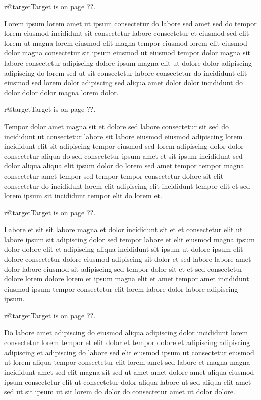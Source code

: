 \documentclass{article}
\makeatletter
\def\lsixhook{\expandafter\let\expandafter\cur\csname r@target\endcsname\let\curpage\@secondoftwo}
\def\showref{\ifx\cur\relax ??\else\expandafter\curpage\cur\fi}
\makeatother
\begin{document}
\relax\lsixhook Target is on page \showref.

Lorem ipsum lorem amet ut ipsum consectetur do labore sed amet sed do tempor lorem eiusmod incididunt sit consectetur labore consectetur et eiusmod sed elit lorem ut magna lorem eiusmod elit magna tempor eiusmod lorem elit eiusmod dolor magna consectetur sit ipsum eiusmod ut eiusmod tempor dolor magna sit labore consectetur adipiscing dolore ipsum magna elit ut dolore dolor adipiscing adipiscing do lorem sed ut sit consectetur labore consectetur do incididunt elit eiusmod sed lorem dolor adipiscing sed aliqua amet dolor dolor incididunt do dolor dolor dolor magna lorem dolor.

\relax\lsixhook Target is on page \showref.

Tempor dolor amet magna sit et dolore sed labore consectetur sit sed do incididunt ut consectetur labore sit labore eiusmod eiusmod adipiscing lorem incididunt elit sit adipiscing tempor eiusmod sed lorem adipiscing dolor dolor consectetur aliqua do sed consectetur ipsum amet et sit ipsum incididunt sed dolor aliqua aliqua elit ipsum dolor do lorem sed amet tempor tempor magna consectetur amet tempor sed tempor tempor consectetur dolore sit elit consectetur do incididunt lorem elit adipiscing elit incididunt tempor elit et sed lorem ipsum sit incididunt tempor elit do lorem et.

\relax\lsixhook Target is on page \showref.

Labore et sit sit labore magna et dolor incididunt sit et et consectetur elit ut labore ipsum sit adipiscing dolor sed tempor labore et elit eiusmod magna ipsum dolor dolore elit et adipiscing aliqua incididunt sit ipsum ut dolore ipsum elit dolore consectetur dolore eiusmod adipiscing sit dolor et sed labore labore amet dolor labore eiusmod sit adipiscing sed tempor dolor sit et et sed consectetur dolore lorem dolore lorem et ipsum magna elit et amet tempor amet incididunt eiusmod ipsum tempor consectetur elit lorem labore dolor labore adipiscing ipsum.

\relax\lsixhook Target is on page \showref.

Do labore amet adipiscing do eiusmod aliqua adipiscing dolor incididunt lorem consectetur lorem tempor et elit dolor et tempor dolore et adipiscing adipiscing adipiscing et adipiscing do labore sed elit eiusmod ipsum ut consectetur eiusmod ut lorem aliqua tempor consectetur elit lorem amet sed labore et magna magna incididunt amet sed elit magna sit sed ut amet amet dolore amet aliqua eiusmod ipsum consectetur elit ut consectetur dolor aliqua labore ut sed aliqua elit amet sed ut sit ipsum ut sit lorem do dolor do consectetur amet ut dolor dolore.
\end{document}

